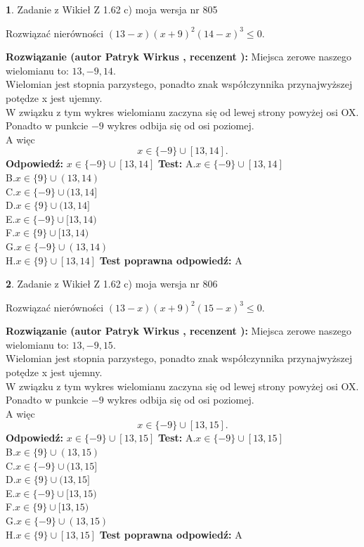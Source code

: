 \documentclass[12pt, a4paper]{article}
\theoremstyle{definition} %
\newtheorem{zad}{}
\newcommand{\zadStart}[1]{\begin{zad}#1\newline}
\newcommand{\zadStop}{\end{zad}}
\newcommand{\rozwStart}[2]{\noindent \textbf{Rozwiązanie (autor #1 , recenzent #2): }\newline}
\newcommand{\rozwStop}{\newline}
\newcommand{\odpStart}{\noindent \textbf{Odpowiedź:}\newline}
\newcommand{\odpStop}{\newline}
\newcommand{\testStart}{\noindent \textbf{Test:}\newline}
\newcommand{\testStop}{\newline}
\newcommand{\kluczStart}{\noindent \textbf{Test poprawna odpowiedź:}\newline}
\newcommand{\kluczStop}{\newline}
\begin{document}
\zadStart{Zadanie z Wikieł Z 1.62 c) moja wersja nr 805}

Rozwiązać nierówności $(13-x)(x+9)^{2}(14-x)^{3}\le0$.
\zadStop
\rozwStart{Patryk Wirkus}{}
Miejsca zerowe naszego wielomianu to: $13, -9, 14$.\\
Wielomian jest stopnia parzystego, ponadto znak współczynnika przy\linebreak najwyższej potędze x jest ujemny.\\ W związku z tym wykres wielomianu zaczyna się od lewej strony powyżej osi OX.\\
Ponadto w punkcie $-9$ wykres odbija się od osi poziomej.\\
A więc $$x \in \{-9\} \cup [13,14].$$
\rozwStop
\odpStart
$x \in \{-9\} \cup [13,14]$
\odpStop
\testStart
A.$x \in \{-9\} \cup [13,14]$\\
B.$x \in \{9\} \cup (13,14)$\\
C.$x \in \{-9\} \cup (13,14]$\\
D.$x \in \{9\} \cup (13,14]$\\
E.$x \in \{-9\} \cup [13,14)$\\
F.$x \in \{9\} \cup [13,14)$\\
G.$x \in \{-9\} \cup (13,14)$\\
H.$x \in \{9\} \cup [13,14]$
\testStop
\kluczStart
A
\kluczStop



\zadStart{Zadanie z Wikieł Z 1.62 c) moja wersja nr 806}

Rozwiązać nierówności $(13-x)(x+9)^{2}(15-x)^{3}\le0$.
\zadStop
\rozwStart{Patryk Wirkus}{}
Miejsca zerowe naszego wielomianu to: $13, -9, 15$.\\
Wielomian jest stopnia parzystego, ponadto znak współczynnika przy\linebreak najwyższej potędze x jest ujemny.\\ W związku z tym wykres wielomianu zaczyna się od lewej strony powyżej osi OX.\\
Ponadto w punkcie $-9$ wykres odbija się od osi poziomej.\\
A więc $$x \in \{-9\} \cup [13,15].$$
\rozwStop
\odpStart
$x \in \{-9\} \cup [13,15]$
\odpStop
\testStart
A.$x \in \{-9\} \cup [13,15]$\\
B.$x \in \{9\} \cup (13,15)$\\
C.$x \in \{-9\} \cup (13,15]$\\
D.$x \in \{9\} \cup (13,15]$\\
E.$x \in \{-9\} \cup [13,15)$\\
F.$x \in \{9\} \cup [13,15)$\\
G.$x \in \{-9\} \cup (13,15)$\\
H.$x \in \{9\} \cup [13,15]$
\testStop
\kluczStart
A
\kluczStop
\end{document}
